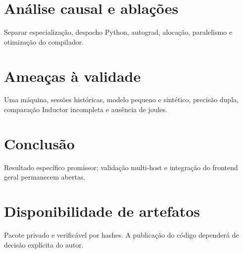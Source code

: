 \documentclass[11pt]{article}
\begin{document}
\section{Análise causal e ablações}
Separar especialização, despacho Python, autograd, alocação, paralelismo e otimização do compilador.
\section{Ameaças à validade}
Uma máquina, sessões históricas, modelo pequeno e sintético, precisão dupla, comparação Inductor incompleta e ausência de joules.
\section{Conclusão}
Resultado específico promissor; validação multi-host e integração do frontend geral permanecem abertas.
\section*{Disponibilidade de artefatos}
Pacote privado e verificável por hashes. A publicação do código dependerá de decisão explícita do autor.


\end{document}
